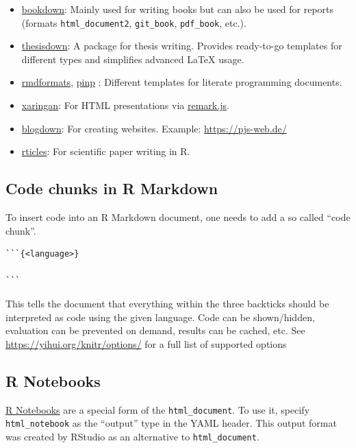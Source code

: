 \documentclass[]{book}
\begin{document}
\begin{itemize}
\item
  \href{https://bookdown.org/yihui/bookdown/}{bookdown}: Mainly used for writing books but can also be used for reports (formats \texttt{html\_document2}, \texttt{git\_book}, \texttt{pdf\_book}, etc.).
\item
  \href{https://github.com/ismayc/thesisdown}{thesisdown}: A package for thesis writing.
  Provides ready-to-go templates for different types and simplifies advanced LaTeX usage.
\item
  \href{https://github.com/juba/rmdformats}{rmdformats}, \href{https://github.com/eddelbuettel/pinp}{pinp} : Different templates for literate programming documents.
\item
  \href{https://github.com/yihui/xaringan}{xaringan}: For HTML presentations via \href{https://remarkjs.com}{remark.js}.
\item
  \href{https://github.com/rstudio/blogdown}{blogdown}: For creating websites. Example: \url{https://pjs-web.de/}
\item
  \href{https://github.com/rstudio/rticles}{rticles}: For scientific paper writing in R.
\end{itemize}

\hypertarget{code-chunks-in-r-markdown}{%
\subsection{Code chunks in R Markdown}\label{code-chunks-in-r-markdown}}

To insert code into an R Markdown document, one needs to add a so called ``code chunk''.

\begin{verbatim}
```{<language>}

```
\end{verbatim}

This tells the document that everything within the three backticks should be interpreted as code using the given language.
Code can be shown/hidden, evaluation can be prevented on demand, results can be cached, etc.
See \url{https://yihui.org/knitr/options/} for a full list of supported options

\hypertarget{r-notebooks}{%
\subsection{R Notebooks}\label{r-notebooks}}

\href{https://bookdown.org/yihui/rmarkdown/notebook.html}{R Notebooks} are a special form of the \texttt{html\_document}.
To use it, specify \texttt{html\_notebook} as the ``output'' type in the YAML header.
This output format was created by RStudio as an alternative to \texttt{html\_document}.
\end{document}
